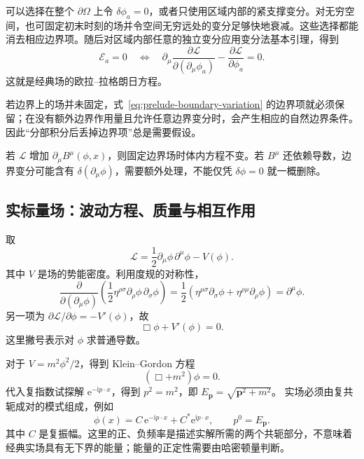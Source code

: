 可以选择在整个 $\partial\Omega$ 上令 $\delta\phi_{a}=0$，或者只使用区域内部的紧支撑变分。对无穷空间，也可固定初末时刻的场并令空间无穷远处的变分足够快地衰减。这些选择都能消去相应边界项。随后对区域内部任意的独立变分应用变分法基本引理，得到
\begin{equation}
  \boxed{\mathcal{E}_{a}=0
  \quad\Longleftrightarrow\quad
  \partial_{\mu}\frac{\partial\mathcal{L}}{\partial(\partial_{\mu}\phi_{a})}
  -\frac{\partial\mathcal{L}}{\partial\phi_{a}}=0.}
  \label{eq:prelude-field-el}
\end{equation}
这就是经典场的欧拉--拉格朗日方程。

若边界上的场并未固定，式~\eqref{eq:prelude-boundary-variation} 的边界项就必须保留；在没有额外边界作用量且允许任意边界变分时，会产生相应的自然边界条件。因此“分部积分后丢掉边界项”总是需要假设。

若 $\mathcal{L}$ 增加 $\partial_{\mu}B^{\mu}(\phi,x)$，则固定边界场时体内方程不变。若 $B^{\mu}$ 还依赖导数，边界变分可能含有 $\delta(\partial_{\mu}\phi)$，需要额外处理，不能仅凭 $\delta\phi=0$ 就一概删除。

\subsection{实标量场：波动方程、质量与相互作用}

取
\begin{equation}
  \mathcal{L}=\frac12\partial_{\mu}\phi\,\partial^{\mu}\phi-V(\phi).
  \label{eq:prelude-real-lagrangian}
\end{equation}
其中 $V$ 是场的势能密度。利用度规的对称性，
\begin{equation}
  \frac{\partial}{\partial(\partial_{\mu}\phi)}
  \left(\frac12\eta^{\rho\sigma}\partial_{\rho}\phi\,\partial_{\sigma}\phi\right)
  =\frac12\left(\eta^{\mu\sigma}\partial_{\sigma}\phi
    +\eta^{\rho\mu}\partial_{\rho}\phi\right)=\partial^{\mu}\phi.
\end{equation}
另一项为 $\partial\mathcal{L}/\partial\phi=-V'(\phi)$，故
\begin{equation}
  \boxed{\Box\phi+V'(\phi)=0.}
  \label{eq:prelude-real-equation}
\end{equation}
这里撇号表示对 $\phi$ 求普通导数。

对于 $V=m^{2}\phi^{2}/2$，得到 Klein--Gordon 方程
\begin{equation}
  (\Box+m^{2})\phi=0.
\end{equation}
代入复指数试探解 $\mathrm{e}^{-\mathrm{i}p\cdot x}$，得到
$p^{2}=m^{2}$，即 $E_{\bm{p}}=\sqrt{\bm{p}^{2}+m^{2}}$。
实场必须由复共轭成对的模式组成，例如
\begin{equation}
  \phi(x)=C\,\mathrm{e}^{-\mathrm{i}p\cdot x}
  +C^{*}\mathrm{e}^{\mathrm{i}p\cdot x},\qquad p^{0}=E_{\bm{p}}.
\end{equation}
其中 $C$ 是复振幅。这里的正、负频率是描述实解所需的两个共轭部分，不意味着经典实场具有无下界的能量；能量的正定性需要由哈密顿量判断。

